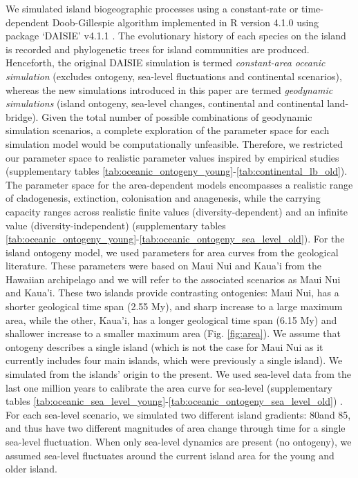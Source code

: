 \documentclass{article}
\begin{document}
We simulated island biogeographic processes using a constant-rate or time-dependent Doob-Gillespie algorithm \citep{gillespie_general_1976, allen_efficient_2009} implemented in R version 4.1.0 using package `DAISIE' v4.1.1 \citep{r_2021, etienne_daisie_2022}. The evolutionary history of each species on the island is recorded and phylogenetic trees for island communities are produced. Henceforth, the original DAISIE simulation \citep{valente_equilibrium_2015} is termed \textit{constant-area oceanic simulation} (excludes ontogeny, sea-level fluctuations and continental scenarios), whereas the new simulations introduced in this paper are termed \textit{geodynamic simulations} (island ontogeny, sea-level changes, continental and continental land-bridge). Given the total number of possible combinations of geodynamic simulation scenarios, a complete exploration of the parameter space for each simulation model would be computationally unfeasible. Therefore, we restricted our parameter space to realistic parameter values inspired by empirical studies (supplementary tables \ref{tab:oceanic_ontogeny_young}-\ref{tab:continental_lb_old}). \\

The parameter space for the area-dependent models encompasses a realistic range of cladogenesis, extinction, colonisation and anagenesis, while the carrying capacity ranges across realistic finite values (diversity-dependent) and an infinite value (diversity-independent) \citep{valente_simple_2020} (supplementary tables \ref{tab:oceanic_ontogeny_young}-\ref{tab:oceanic_ontogeny_sea_level_old}). For the island ontogeny model, we used parameters for area curves from the geological literature. These parameters were based on Maui Nui and Kaua'i from the Hawaiian archipelago \citep{lim_true_2017} and we will refer to the associated scenarios as Maui Nui and Kaua'i. These two islands provide contrasting ontogenies: Maui Nui, has a shorter geological time span (2.55 My), and sharp increase to a large maximum area, while the other, Kaua'i, has a longer geological time span (6.15 My) and shallower increase to a smaller maximum area (Fig. \ref{fig:area}). We assume that ontogeny describes a single island (which is not the case for Maui Nui as it currently includes four main islands, which were previously a single island). We simulated from the islands’ origin to the present. We used sea-level data from the last one million years to calibrate the area curve for sea-level (supplementary tables \ref{tab:oceanic_sea_level_young}-\ref{tab:oceanic_ontogeny_sea_level_old}) \citep{bintanja_modelled_2005}. For each sea-level scenario, we simulated two different island gradients: 80\degree and 85\degree, and thus have two different magnitudes of area change through time for a single sea-level fluctuation. When only sea-level dynamics are present (no ontogeny), we assumed sea-level fluctuates around the current island area for the young and older island. \\
\end{document}
